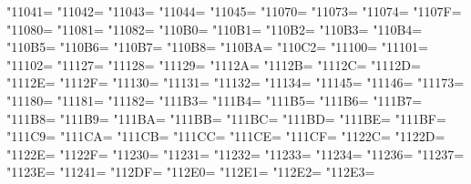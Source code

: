 \XeTeXcharclass"11041=\KclassCM
\XeTeXcharclass"11042=\KclassCM
\XeTeXcharclass"11043=\KclassCM
\XeTeXcharclass"11044=\KclassCM
\XeTeXcharclass"11045=\KclassCM
\XeTeXcharclass"11070=\KclassCM
\XeTeXcharclass"11073=\KclassCM
\XeTeXcharclass"11074=\KclassCM
\XeTeXcharclass"1107F=\KclassCM
\XeTeXcharclass"11080=\KclassCM
\XeTeXcharclass"11081=\KclassCM
\XeTeXcharclass"11082=\KclassCM
\XeTeXcharclass"110B0=\KclassCM
\XeTeXcharclass"110B1=\KclassCM
\XeTeXcharclass"110B2=\KclassCM
\XeTeXcharclass"110B3=\KclassCM
\XeTeXcharclass"110B4=\KclassCM
\XeTeXcharclass"110B5=\KclassCM
\XeTeXcharclass"110B6=\KclassCM
\XeTeXcharclass"110B7=\KclassCM
\XeTeXcharclass"110B8=\KclassCM
\XeTeXcharclass"110BA=\KclassCM
\XeTeXcharclass"110C2=\KclassCM
\XeTeXcharclass"11100=\KclassCM
\XeTeXcharclass"11101=\KclassCM
\XeTeXcharclass"11102=\KclassCM
\XeTeXcharclass"11127=\KclassCM
\XeTeXcharclass"11128=\KclassCM
\XeTeXcharclass"11129=\KclassCM
\XeTeXcharclass"1112A=\KclassCM
\XeTeXcharclass"1112B=\KclassCM
\XeTeXcharclass"1112C=\KclassCM
\XeTeXcharclass"1112D=\KclassCM
\XeTeXcharclass"1112E=\KclassCM
\XeTeXcharclass"1112F=\KclassCM
\XeTeXcharclass"11130=\KclassCM
\XeTeXcharclass"11131=\KclassCM
\XeTeXcharclass"11132=\KclassCM
\XeTeXcharclass"11134=\KclassCM
\XeTeXcharclass"11145=\KclassCM
\XeTeXcharclass"11146=\KclassCM
\XeTeXcharclass"11173=\KclassCM
\XeTeXcharclass"11180=\KclassCM
\XeTeXcharclass"11181=\KclassCM
\XeTeXcharclass"11182=\KclassCM
\XeTeXcharclass"111B3=\KclassCM
\XeTeXcharclass"111B4=\KclassCM
\XeTeXcharclass"111B5=\KclassCM
\XeTeXcharclass"111B6=\KclassCM
\XeTeXcharclass"111B7=\KclassCM
\XeTeXcharclass"111B8=\KclassCM
\XeTeXcharclass"111B9=\KclassCM
\XeTeXcharclass"111BA=\KclassCM
\XeTeXcharclass"111BB=\KclassCM
\XeTeXcharclass"111BC=\KclassCM
\XeTeXcharclass"111BD=\KclassCM
\XeTeXcharclass"111BE=\KclassCM
\XeTeXcharclass"111BF=\KclassCM
\XeTeXcharclass"111C9=\KclassCM
\XeTeXcharclass"111CA=\KclassCM
\XeTeXcharclass"111CB=\KclassCM
\XeTeXcharclass"111CC=\KclassCM
\XeTeXcharclass"111CE=\KclassCM
\XeTeXcharclass"111CF=\KclassCM
\XeTeXcharclass"1122C=\KclassCM
\XeTeXcharclass"1122D=\KclassCM
\XeTeXcharclass"1122E=\KclassCM
\XeTeXcharclass"1122F=\KclassCM
\XeTeXcharclass"11230=\KclassCM
\XeTeXcharclass"11231=\KclassCM
\XeTeXcharclass"11232=\KclassCM
\XeTeXcharclass"11233=\KclassCM
\XeTeXcharclass"11234=\KclassCM
\XeTeXcharclass"11236=\KclassCM
\XeTeXcharclass"11237=\KclassCM
\XeTeXcharclass"1123E=\KclassCM
\XeTeXcharclass"11241=\KclassCM
\XeTeXcharclass"112DF=\KclassCM
\XeTeXcharclass"112E0=\KclassCM
\XeTeXcharclass"112E1=\KclassCM
\XeTeXcharclass"112E2=\KclassCM
\XeTeXcharclass"112E3=\KclassCM
